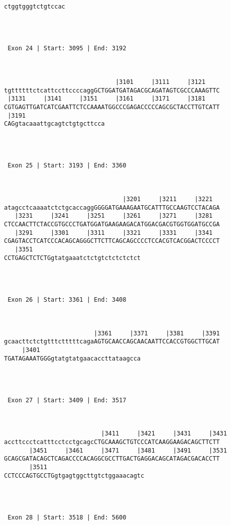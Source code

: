 \documentclass{article}
\begin{document}
\begin{Verbatim}
ctggtgggtctgtccac




 Exon 24 | Start: 3095 | End: 3192 



                               |3101     |3111     |3121    
tgttttttctcattccttccccaggGCTGGATGATAGACGCAGATAGTCGCCCAAAGTTC
 |3131     |3141     |3151     |3161     |3171     |3181    
CGTGAGTTGATCATCGAATTCTCCAAAATGGCCCGAGACCCCCAGCGCTACCTTGTCATT
 |3191                      
CAGgtacaaattgcagtctgtgcttcca




 Exon 25 | Start: 3193 | End: 3360 



                                 |3201     |3211     |3221  
atagcctcaaaatctctgcaccaggGGGGATGAAAGAATGCATTTGCCAAGTCCTACAGA
   |3231     |3241     |3251     |3261     |3271     |3281  
CTCCAACTTCTACCGTGCCCTGATGGATGAAGAAGACATGGACGACGTGGTGGATGCCGA
   |3291     |3301     |3311     |3321     |3331     |3341  
CGAGTACCTCATCCCACAGCAGGGCTTCTTCAGCAGCCCCTCCACGTCACGGACTCCCCT
   |3351                              
CCTGAGCTCTCTGgtatgaaatctctgtctctctctct




 Exon 26 | Start: 3361 | End: 3408 



                         |3361     |3371     |3381     |3391
gcaacttctctgtttctttttcagaAGTGCAACCAGCAACAATTCCACCGTGGCTTGCAT
     |3401                            
TGATAGAAATGGGgtatgtatgaacaccttataagcca




 Exon 27 | Start: 3409 | End: 3517 



                           |3411     |3421     |3431     |3431
accttccctcatttcctcctgcagcCTGCAAAGCTGTCCCATCAAGGAAGACAGCTTCTT
       |3451     |3461     |3471     |3481     |3491     |3531
GCAGCGATACAGCTCAGACCCCACAGGCGCCTTGACTGAGGACAGCATAGACGACACCTT
       |3511                           
CCTCCCAGTGCCTGgtgagtggcttgtctggaaacagtc




 Exon 28 | Start: 3518 | End: 5600 




\end{Verbatim}
\end{document}
